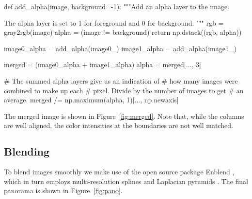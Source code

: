    \begin{pyverbatim}
      def add_alpha(image, background=-1):
          """Add an alpha layer to the image.

          The alpha layer is set to 1 for foreground
          and 0 for background.
          """
          rgb = gray2rgb(image)
          alpha = (image != background)
          return np.dstack((rgb, alpha))

      image0_alpha = add_alpha(image0_)
      image1_alpha = add_alpha(image1_)

      merged = (image0_alpha + image1_alpha)
      alpha = merged[..., 3]

      # The summed alpha layers give us an indication of
      # how many images were combined to make up each
      # pixel.  Divide by the number of images to get
      # an average.
      merged /= np.maximum(alpha, 1)[..., np.newaxis]
    \end{pyverbatim}

    The merged image is shown in Figure~\ref{fig:merged}. Note that, while the columns are well aligned, the color intensities at the boundaries are not well matched.

  

  \subsection{Blending}
    \label{sub:blending}

    To blend images smoothly we make use of the open source package Enblend \citep{Enblend}, which in turn employs multi-resolution splines and Laplacian pyramids \citep{burt_adelson_0,burt_adelson_1}. The final panorama is shown in Figure~\ref{fig:pano}.
